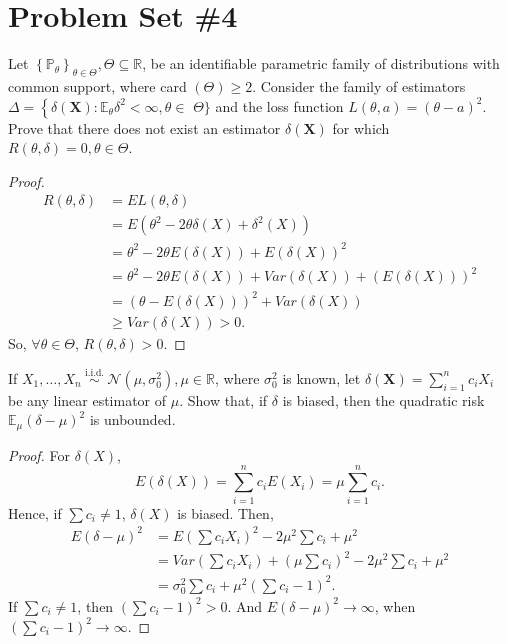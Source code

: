 \section{Problem Set \#4}

\begin{exercise}
    Let \(\left\{\mathbb{P}_{\theta}\right\}_{\theta \in \Theta}, \Theta \subseteq \mathbb{R}\), be an identifiable parametric family of distributions with common support, where card \((\Theta) \geq 2\). Consider the family of estimators \(\Delta=\left\{\delta(\mathbf{X}): \mathbb{E}_{\theta} \delta^{2}<\infty, \theta \in\right.\) \(\Theta\}\) and the loss function \(L(\theta, a)=(\theta-a)^{2}\). Prove that there does not exist an estimator \(\delta(\mathbf{X})\) for which \(R(\theta, \delta)=0, \theta \in \Theta\).
\end{exercise}

\begin{proof}
    \[
        \begin{aligned}
            R(\theta, \delta)&=EL(\theta, \delta)\\
            &=E(\theta^2-2\theta\delta(X)+\delta^2(X))\\
            &=\theta^2-2\theta E(\delta(X))+E(\delta(X))^2\\
            &=\theta^2-2\theta E(\delta(X))+Var(\delta(X))+(E(\delta(X)))^2\\
            &=(\theta-E(\delta(X)))^2+Var(\delta(X))\\
            &\geqslant Var(\delta(X))>0. 
        \end{aligned}
    \]
    So, $\forall \theta \in \Theta$, $R(\theta, \delta)>0$. 
\end{proof}

\begin{exercise}
    If \(X_{1}, \ldots, X_{n} \stackrel{\text { i.i.d. }}{\sim} \mathcal{N}\left(\mu, \sigma_{0}^{2}\right), \mu \in \mathbb{R}\), where \(\sigma_{0}^{2}\) is known, let \(\delta(\mathbf{X})=\sum_{i=1}^{n} c_{i} X_{i}\) be any linear estimator of \(\mu\). Show that, if \(\delta\) is biased, then the quadratic risk \(\mathbb{E}_{\mu}(\delta-\mu)^{2}\) is unbounded. 
\end{exercise}

\begin{proof}
    For $\delta(X)$, 
    \[
        E(\delta(X))=\sum_{i=1}^nc_i E(X_i)=\mu\sum_{i=1}^nc_i. 
    \]
    Hence, if $\sum c_i\neq 1$, $\delta(X)$ is biased. Then, 
    \[
        \begin{aligned}
            E(\delta-\mu)^2&=E\left(\sum c_iX_i\right)^2-2\mu^2\sum c_i+\mu^2\\
            &=Var\left(\sum c_iX_i\right)+\left(\mu\sum c_i\right)^2-2\mu^2\sum c_i+\mu^2\\
            &=\sigma_0^2\sum c_i+\mu^2\left(\sum c_i-1\right)^2. 
        \end{aligned}
    \] 
    If $\sum c_i\neq 1$, then $\left(\sum c_i-1\right)^2>0$. And $E(\delta-\mu)^2\to\infty$, when $\left(\sum c_i-1\right)^2\to \infty$. 
\end{proof}

